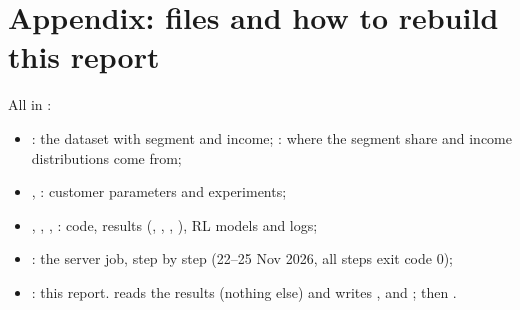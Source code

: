 \section*{Appendix: files and how to rebuild this report}

All in :
\begin{itemize}
  \item {}: the dataset with segment and income; : where the segment share and income distributions come from;
  \item {}, : customer parameters and experiments;
  \item {}, , , : code, results (, , , ), RL models and logs;
  \item {}: the server job, step by step (22--25 Nov 2026, all steps exit code 0);
  \item {}: this report.  reads the results (nothing else) and writes ,  and ; then .
\end{itemize}

